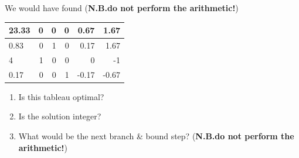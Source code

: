 \documentclass[12pt]{article}
\begin{document}
\begin{itemize}
\begin{enumerate}[(i)]
\begin{enumerate}
				      We would have found  ({\bf N.B.do not perform the arithmetic!}) \smallskip
				      \begin{center}
				      \begin{tabular}[h]{|l|rrrrr|}\hline
				      	23.33       &      0&             0&             0&          0.67&          1.67\\ \hline
				      	0.83&             0&          1&             0&          0.17&          1.67\\
				      	4 &         1 &            0 &            0 &            0 &        -1\\
				      	0.17  &           0  &           0  &        1  &       -0.17  &       -0.67\\\hline
				      \end{tabular}
				      \end{center}
				      \smallskip
				      \begin{enumerate}
				      	\item 
				      	Is this tableau optimal?
				      	\item Is the solution integer?
				      	\item What would be the next branch \& bound step?  ({\bf N.B.do not perform the arithmetic!})
				      \end{enumerate}
				\end{enumerate}
			\end{enumerate}

			
		\end{itemize}
		
\end{document}
